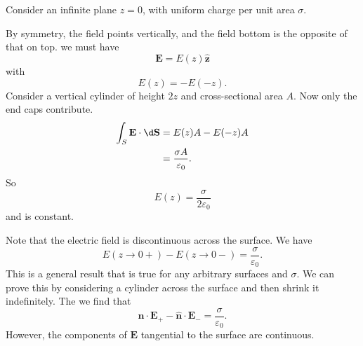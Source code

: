 \documentclass[a4paper]{article}
\begin{document}
\begin{eg}
  Consider an infinite plane $z = 0$, with uniform charge per unit area $\sigma$.
  \begin{center}
  \end{center}
  By symmetry, the field points vertically, and the field bottom is the opposite of that on top. we must have
  \[
    \mathbf{E} = E(z)\hat{\mathbf{z}}
  \]
  with
  \[
    E(z) = -E(-z).
  \]
  Consider a vertical cylinder of height $2z$ and cross-sectional area $A$. Now only the end caps contribute.
  \begin{align*}
    \int_S \mathbf{E} \cdot \d \mathbf{S} &= E(z) A - E(-z) A\\
    &=\frac{\sigma A}{\varepsilon _0}.
  \end{align*}
  So
  \[
    E(z) = \frac{\sigma }{2\varepsilon_0}
  \]
  and is constant.

  Note that the electric field is discontinuous across the surface. We have
  \[
    E(z\to 0+) - E(z\to 0-) = \frac{\sigma}{\varepsilon_0}.
  \]
  This is a general result that is true for any arbitrary surfaces and $\sigma$. We can prove this by considering a cylinder across the surface and then shrink it indefinitely. The we find that
  \[
    \hat{\mathbf{n}}\cdot \mathbf{E}_+ - \hat{\mathbf{n}}\cdot \mathbf{E}_- = \frac{\sigma}{\varepsilon_0}.
  \]
  However, the components of $\mathbf{E}$ tangential to the surface are continuous.
\end{eg}
\end{document}
